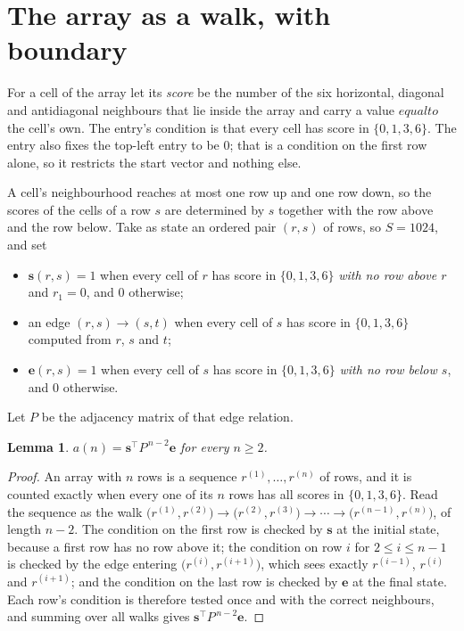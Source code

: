 \documentclass[11pt,a4paper]{article}
\theoremstyle{plain}
\newtheorem{lemma}[theorem]{Lemma}
\theoremstyle{definition}
\begin{document}
\section{The array as a walk, with boundary}

For a cell of the array let its \emph{score} be the number of the six horizontal, diagonal and antidiagonal neighbours that lie inside
the array and carry a value $equal to$ the cell's own. The entry's condition is that every cell
has score in $\{0,1,3,6\}$. The entry also fixes the top-left entry to be $0$; that is a condition on the first row alone, so it restricts the start vector and nothing else.

A cell's neighbourhood reaches at most one row up and one row down, so the scores of the
cells of a row $s$ are determined by $s$ together with the row above and the row below.
Take as state an ordered pair $(r,s)$ of rows, so $S=1024$, and set
\begin{itemize}
\item $\mathbf{s}(r,s)=1$ when every cell of $r$ has score in $\{0,1,3,6\}$ \emph{with no row
above $r$} and $r_1=0$, and $0$ otherwise;
\item an edge $(r,s)\to(s,t)$ when every cell of $s$ has score in $\{0,1,3,6\}$ computed from
$r$, $s$ and $t$;
\item $\mathbf{e}(r,s)=1$ when every cell of $s$ has score in $\{0,1,3,6\}$ \emph{with no row
below $s$}, and $0$ otherwise.
\end{itemize}
Let $P$ be the adjacency matrix of that edge relation.

\begin{lemma}\label{lem:walk}
$a(n)=\mathbf{s}^{\!\top}P^{\,n-2}\mathbf{e}$ for every $n\ge2$.
\end{lemma}

\begin{proof}
An array with $n$ rows is a sequence $r^{(1)},\dots,r^{(n)}$ of rows, and it is counted
exactly when every one of its $n$ rows has all scores in $\{0,1,3,6\}$. Read the sequence as the
walk $\bigl(r^{(1)},r^{(2)}\bigr)\to\bigl(r^{(2)},r^{(3)}\bigr)\to\cdots\to
\bigl(r^{(n-1)},r^{(n)}\bigr)$, of length $n-2$. The condition on the first row is
checked by $\mathbf{s}$ at the initial state, because a first row has no row above it; the
condition on row $i$ for $2\le i\le n-1$ is checked by the edge entering
$\bigl(r^{(i)},r^{(i+1)}\bigr)$, which sees exactly $r^{(i-1)}$, $r^{(i)}$ and
$r^{(i+1)}$; and the condition on the last row is checked by $\mathbf{e}$ at the final
state. Each row's condition is therefore tested once and with the correct neighbours, and
summing over all walks gives $\mathbf{s}^{\!\top}P^{\,n-2}\mathbf{e}$.
\end{proof}
\end{document}
